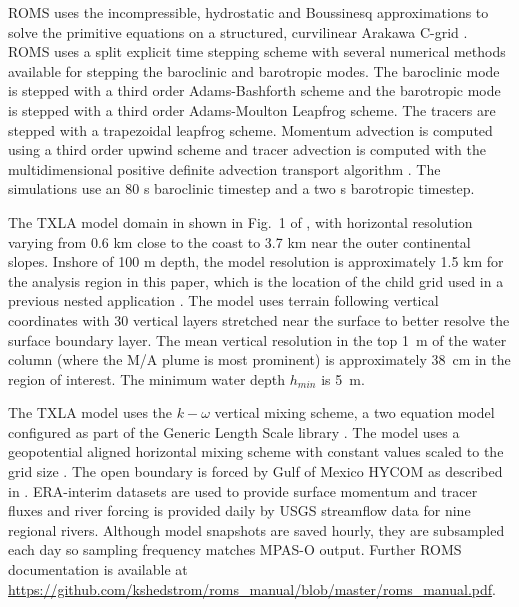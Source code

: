 ROMS uses the incompressible, hydrostatic and Boussinesq approximations to solve the primitive equations on a structured, curvilinear Arakawa C-grid \citep{Arakawa_1977, shchepetkin2005regional}. ROMS uses a split explicit time stepping scheme with several numerical methods available for stepping the baroclinic and barotropic modes. The baroclinic mode is stepped with a third order Adams-Bashforth scheme and the barotropic mode is stepped with a third order Adams-Moulton Leapfrog scheme. The tracers are stepped with a trapezoidal leapfrog scheme. Momentum advection is computed using a third order upwind scheme and tracer advection is computed with the multidimensional positive definite advection transport algorithm \citep{Smolarkiewicz_1998}. The simulations use an 80 s baroclinic timestep and a two s barotropic timestep. 

The TXLA model domain in shown in Fig.~1 of \cite{Schlichting23}, with horizontal resolution varying from 0.6 km close to the coast to 3.7 km near the outer continental slopes. Inshore of 100 m depth, the model resolution is approximately 1.5 km for the analysis region in this paper, which is the location of the child grid used in a previous nested application \citep{Schlichting23}. The model uses terrain following vertical coordinates with 30 vertical layers stretched near the surface to better resolve the surface boundary layer. The mean vertical resolution in the top 1~m of the water column (where the M/A plume is most prominent) is approximately 38~cm in the region of interest. The minimum water depth $h_{min}$ is 5~m. 

The TXLA model uses the $k-\omega$ vertical mixing scheme, a two equation model configured as part of the Generic Length Scale library \citep{umlauf2003extending, Warner_2005}. The model uses a geopotential aligned horizontal mixing scheme with constant values scaled to the grid size \citep[see Section 3.2 of ][]{Schlichting23}. The open boundary is forced by Gulf of Mexico HYCOM as described in \citep{Zhang_2012_forecast}. ERA-interim datasets are used to provide surface momentum and tracer fluxes \citep{Dee_2011} and river forcing is provided daily by USGS streamflow data for nine regional rivers. Although model snapshots are saved hourly, they are subsampled each day so sampling frequency matches MPAS-O output. Further ROMS documentation is available at \url{https://github.com/kshedstrom/roms_manual/blob/master/roms_manual.pdf}.

